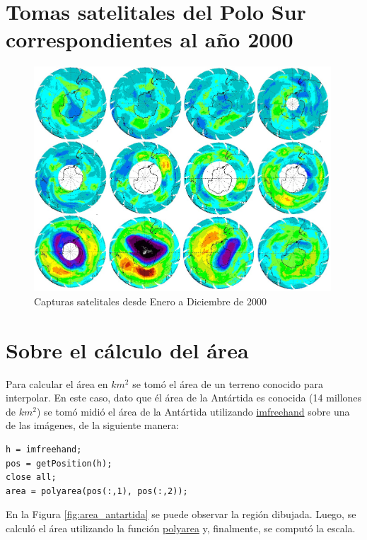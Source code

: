 \documentclass[a4paper]{article}
\begin{document}
\newpage
\begin{appendices}

\section{Tomas satelitales del Polo Sur correspondientes al año 2000}
\label{appendix:year2000}

\begin{figure}[ht]
\centering
\includegraphics[width=0.99\textwidth]{assets/year2000.png}
\caption{\label{fig:year2000}Capturas satelitales desde Enero a Diciembre de 2000}
\end{figure}

\section{Sobre el cálculo del área}
\label{appendix:calculoArea}

Para calcular el área en $km^2$ se tomó el área de un terreno conocido para interpolar. En este caso, dato que él área de la Antártida es conocida (14 millones de $km^2$) se tomó midió el área de la Antártida utilizando \href{https://la.mathworks.com/help/images/ref/imfreehand.html}{imfreehand} sobre una de las imágenes, de la siguiente manera:

\begin{lstlisting}
h = imfreehand;
pos = getPosition(h);
close all;
area = polyarea(pos(:,1), pos(:,2));
\end{lstlisting}

En la Figura \ref{fig:area_antartida} se puede observar la región dibujada. Luego, se calculó el área utilizando la función \href{https://la.mathworks.com/help/images/ref/polyarea.html}{polyarea} y, finalmente, se computó la escala.


\end{appendices}
\end{document}
